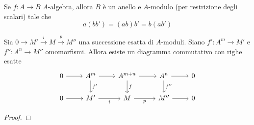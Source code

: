 
\begin{remark}
    Se \(f : A\to B\) \(A\)-algebra, allora \(B\) è un anello e \(A\)-modulo
    (per restrizione degli scalari) tale che 
    \[
      a{(b b')} = {(ab)}b' = b{(ab')}
    \]
\end{remark}



\begin{lemma}{}
    Sia \(0 \to M' \overset{i}{\to } M \overset{p}{\to } M''\) una successione
    esatta di \(A\)-moduli. Siano \(f': A^{m} \to M'\) e \(f'' : A^{n}\to M''\)
    omomorfismi. Allora esiste un diagramma commutativo con righe esatte
\[\begin{tikzcd}
	0 & A^{m} & A^{m+n} & A^{n} & 0 \\
	0 & M' & M & M'' & 0
	\arrow[from=1-1, to=1-2]
	\arrow[from=1-2, to=1-3]
	\arrow["{f'}", from=1-2, to=2-2]
	\arrow[from=1-3, to=1-4]
	\arrow["f", from=1-3, to=2-3]
	\arrow[from=1-4, to=1-5]
	\arrow["{f''}", from=1-4, to=2-4]
	\arrow[from=2-1, to=2-2]
	\arrow["i"', from=2-2, to=2-3]
	\arrow["p"', from=2-3, to=2-4]
	\arrow[from=2-4, to=2-5]
\end{tikzcd}\]
\end{lemma}\label{lem:com}

\begin{proof}{}
\end{proof}


